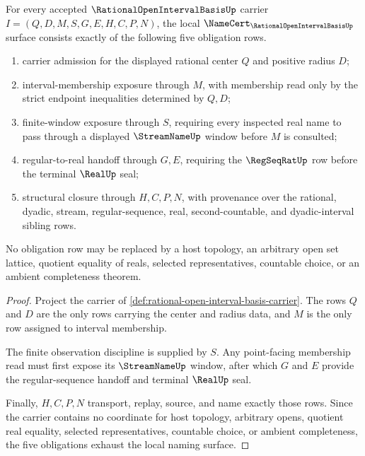 \begin{theorem}
\label{thm:rational-open-interval-basis-namecert-obligations}
For every accepted $\RationalOpenIntervalBasisUp$ carrier $I=(Q,D,M,S,G,E,H,C,P,N)$, the local $\NameCert_{\RationalOpenIntervalBasisUp}$ surface consists exactly of the following five obligation rows.
\begin{enumerate}
\item carrier admission for the displayed rational center $Q$ and positive radius $D$;
\item interval-membership exposure through $M$, with membership read only by the strict endpoint inequalities determined by $Q,D$;
\item finite-window exposure through $S$, requiring every inspected real name to pass through a displayed $\StreamNameUp$ window before $M$ is consulted;
\item regular-to-real handoff through $G,E$, requiring the $\RegSeqRatUp$ row before the terminal $\RealUp$ seal;
\item structural closure through $H,C,P,N$, with provenance over the rational, dyadic, stream, regular-sequence, real, second-countable, and dyadic-interval sibling rows.
\end{enumerate}
No obligation row may be replaced by a host topology, an arbitrary open set lattice, quotient equality of reals, selected representatives, countable choice, or an ambient completeness theorem.
\end{theorem}

\begin{proof}
Project the carrier of \autoref{def:rational-open-interval-basis-carrier}. The rows $Q$ and $D$ are the only rows carrying the center and radius data, and $M$ is the only row assigned to interval membership.

The finite observation discipline is supplied by $S$. Any point-facing membership read must first expose its $\StreamNameUp$ window, after which $G$ and $E$ provide the regular-sequence handoff and terminal $\RealUp$ seal.

Finally, $H,C,P,N$ transport, replay, source, and name exactly those rows. Since the carrier contains no coordinate for host topology, arbitrary opens, quotient real equality, selected representatives, countable choice, or ambient completeness, the five obligations exhaust the local naming surface.
\end{proof}

